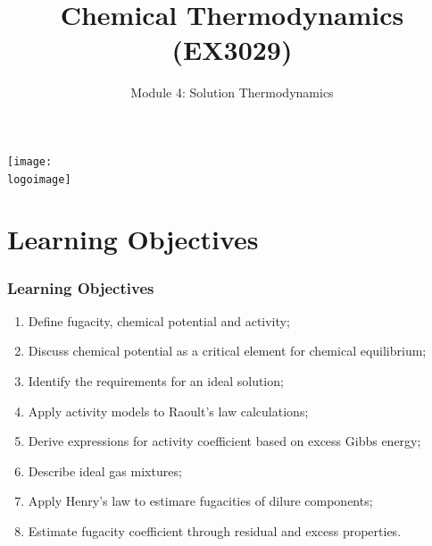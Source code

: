 \documentclass[10pt,compress,unknownkeysallowed]{beamer}
\institute{School of Engineering}
\title{Chemical Thermodynamics (EX3029)}
\subtitle{Module 4: Solution Thermodynamics}
\date[ ]{ }
\newcommand{\logoimage}{../../FigBanner/UoAHorizBanner}
\begin{document}
\begin{frame}
  \titlepage
  \vfill%
  \begin{center}
    \texttt{[image: \\logoimage]}
  \end{center}
\end{frame}





\section{Learning Objectives}

\begin{frame}
 \frametitle{Learning Objectives}
   \begin{enumerate}
     \item<1-> Define fugacity, chemical potential and activity; 
     \item<1-> Discuss chemical potential as a critical element for chemical equilibrium;
     \item<1-> Identify the requirements for an ideal solution;       
     \item<1-> Apply activity models to Raoult's law calculations;
     \item<1-> Derive expressions for activity coefficient based on excess Gibbs energy;
     \item<1-> Describe ideal gas mixtures;
     \item<1-> Apply Henry's law to estimare fugacities of dilure components;
     \item<1-> Estimate fugacity coefficient through residual and excess properties.
   \end{enumerate}

\end{frame}

\end{document}
